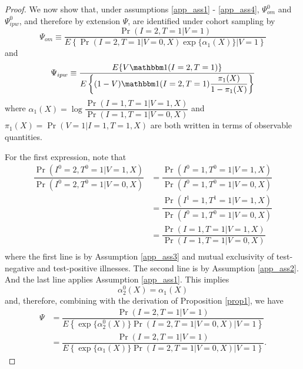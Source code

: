 \begin{appendix}
\begin{proof}
    We now show that, under assumptions \ref{app_ass1} - \ref{app_ass4}, $\Psi^0_{om}$ and $\Psi^0_{ipw}$, and therefore by extension $\Psi$, are identified under cohort sampling by 
    \begin{equation}
        \Psi_{om} \equiv \dfrac{\Pr(I = 2, T = 1 | V = 1)}{E\left\{\Pr(I = 2, T = 1 | V = 0, X) \exp\{\alpha_1(X)\} \Big| V = 1 \right\}}
    \end{equation}
    and 
    \begin{equation}
        \Psi_{ipw} \equiv \dfrac{E\{V \mathbbm 1 (I = 2, T = 1)\}}{E\left\{ (1 - V) \mathbbm 1(I = 2, T = 1) \dfrac{\pi_1(X)}{1 - \pi_1(X)}\right\}}
    \end{equation}
    where $\alpha_1(X) = \log \dfrac{\Pr(I = 1, T = 1 | V = 1, X)}{\Pr(I = 1, T = 1 | V = 0, X)}$ and $\pi_1(X) = \Pr(V = 1| I = 1, T = 1, X)$ are both written in terms of observable quantities.
    
    For the first expression, note that 
    \begin{align*}
        \dfrac{\Pr(I^0 = 2, T^0=1 | V = 1, X)}{\Pr(I^0 = 2, T^0=1 | V = 0, X)} &= \dfrac{\Pr(I^0 = 1, T^0=1 | V = 1, X)}{\Pr(I^0 = 1, T^0=1 | V = 0, X)} \\
        &= \dfrac{\Pr(I^1 = 1, T^1=1 | V = 1, X)}{\Pr(I^0 = 1, T^0=1 | V = 0, X)} \\
        &= \dfrac{\Pr(I = 1, T = 1 | V = 1, X)}{\Pr(I = 1, T = 1 | V = 0, X)} \\
    \end{align*}
    where the first line is by Assumption \ref{app_ass3} and mutual exclusivity of test-negative and test-positive illnesses. The second line is by Assumption \ref{app_ass2}. And the last line applies Assumption \ref{app_ass1}. This implies
    \begin{equation*}
        \alpha_2^0(X) = \alpha_1(X)
    \end{equation*}
    and, therefore, combining with the derivation of Proposition \ref{prop1}, we have
    \begin{align*}
        \Psi &= \dfrac{\Pr(I = 2, T = 1 | V = 1)}{E\left\{ \exp\{\alpha^0_2(X)\} \Pr(I = 2, T = 1 | V = 0, X) \Big| V = 1 \right\}} \\
        &= \dfrac{\Pr(I = 2, T = 1 | V = 1)}{E\left\{ \exp\{\alpha_1(X)\} \Pr(I = 2, T = 1 | V = 0, X) \Big| V = 1 \right\}}.
    \end{align*}
    

\end{proof}
\end{appendix}

